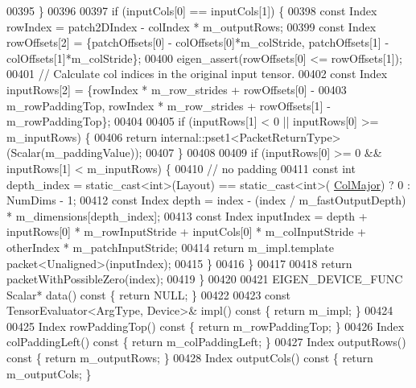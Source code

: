 \begin{DoxyCode}
00395     \}
00396 
00397     \textcolor{keywordflow}{if} (inputCols[0] == inputCols[1]) \{
00398       \textcolor{keyword}{const} Index rowIndex = patch2DIndex - colIndex * m\_outputRows;
00399       \textcolor{keyword}{const} Index rowOffsets[2] = \{patchOffsets[0] - colOffsets[0]*m\_colStride, patchOffsets[1] - 
      colOffsets[1]*m\_colStride\};
00400       eigen\_assert(rowOffsets[0] <= rowOffsets[1]);
00401       \textcolor{comment}{// Calculate col indices in the original input tensor.}
00402       \textcolor{keyword}{const} Index inputRows[2] = \{rowIndex * m\_row\_strides + rowOffsets[0] -
00403         m\_rowPaddingTop, rowIndex * m\_row\_strides + rowOffsets[1] - m\_rowPaddingTop\};
00404 
00405       \textcolor{keywordflow}{if} (inputRows[1] < 0 || inputRows[0] >= m\_inputRows) \{
00406         \textcolor{keywordflow}{return} internal::pset1<PacketReturnType>(Scalar(m\_paddingValue));
00407       \}
00408 
00409       \textcolor{keywordflow}{if} (inputRows[0] >= 0 && inputRows[1] < m\_inputRows) \{
00410         \textcolor{comment}{// no padding}
00411         \textcolor{keyword}{const} \textcolor{keywordtype}{int} depth\_index = \textcolor{keyword}{static\_cast<}\textcolor{keywordtype}{int}\textcolor{keyword}{>}(Layout) == static\_cast<int>(
      \hyperlink{group__enums_ggaacded1a18ae58b0f554751f6cdf9eb13a0cbd4bdd0abcfc0224c5fcb5e4f6669a}{ColMajor}) ? 0 : NumDims - 1;
00412         \textcolor{keyword}{const} Index depth = index - (index / m\_fastOutputDepth) * m\_dimensions[depth\_index];
00413         \textcolor{keyword}{const} Index inputIndex = depth + inputRows[0] * m\_rowInputStride + inputCols[0] * m\_colInputStride 
      + otherIndex * m\_patchInputStride;
00414         \textcolor{keywordflow}{return} m\_impl.template packet<Unaligned>(inputIndex);
00415       \}
00416     \}
00417 
00418     \textcolor{keywordflow}{return} packetWithPossibleZero(index);
00419   \}
00420 
00421   EIGEN\_DEVICE\_FUNC Scalar* data()\textcolor{keyword}{ const }\{ \textcolor{keywordflow}{return} NULL; \}
00422 
00423   \textcolor{keyword}{const} TensorEvaluator<ArgType, Device>& impl()\textcolor{keyword}{ const }\{ \textcolor{keywordflow}{return} m\_impl; \}
00424 
00425   Index rowPaddingTop()\textcolor{keyword}{ const }\{ \textcolor{keywordflow}{return} m\_rowPaddingTop; \}
00426   Index colPaddingLeft()\textcolor{keyword}{ const }\{ \textcolor{keywordflow}{return} m\_colPaddingLeft; \}
00427   Index outputRows()\textcolor{keyword}{ const }\{ \textcolor{keywordflow}{return} m\_outputRows; \}
00428   Index outputCols()\textcolor{keyword}{ const }\{ \textcolor{keywordflow}{return} m\_outputCols; \}

\end{DoxyCode}
